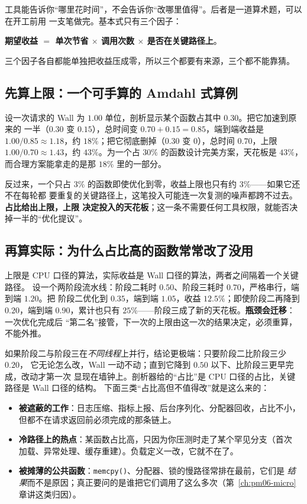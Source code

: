 \documentclass[12pt,a4paper,fontset=fandol]{ctexbook}
\newcommand{\Fn}[1]{\texttt{#1()}}
\newcommand{\Lang}[1]{\textsf{#1}}
\newcommand{\MWall}{\Lang{Wall}}
\newcommand{\MCpu}{\Lang{CPU}}
\begin{document}
工具能告诉你``哪里花时间''，不会告诉你``改哪里值得''。后者是一道算术题，可以在开工前用
一支笔做完。基本式只有三个因子：

\textbf{期望收益 $=$ 单次节省 $\times$ 调用次数 $\times$ 是否在关键路径上}。

三个因子各自都能单独把收益压成零，所以三个都要有来源，三个都不能靠猜。

\subsection{先算上限：一个可手算的 Amdahl 式算例}
\label{sub:pm01-amdahl}

设一次请求的 \MWall{} 为 $1.00$ 单位，剖析显示某个函数占其中 $0.30$。把它加速到原来的
一半（$0.30$ 变 $0.15$），总时间变 $0.70 + 0.15 = 0.85$，端到端收益是
$1.00/0.85 \approx 1.18$，约 $18\%$；把它彻底删掉（$0.30$ 变 $0$），总时间 $0.70$，上限
$1.00/0.70 \approx 1.43$，约 $43\%$。为一个占 $30\%$ 的函数设计完美方案，天花板是
$43\%$，而合理方案能拿走的是那 $18\%$ 里的一部分。

反过来，一个只占 $3\%$ 的函数即使优化到零，收益上限也只有约 $3\%$——如果它还不在每轮都
要重复的关键路径上，这笔投入可能连一次复测的噪声都跨不过去。\textbf{占比给出上限，上限
决定投入的天花板}；这一条不需要任何工具权限，就能否决掉一半的``优化提议''。

\subsection{再算实际：为什么占比高的函数常常改了没用}
\label{sub:pm01-critpath}

上限是 \MCpu{} 口径的算法，实际收益是 \MWall{} 口径的算法，两者之间隔着一个关键路径。
设一个两阶段流水线：阶段二耗时 $0.50$、阶段三耗时 $0.70$，严格串行，端到端 $1.20$。把
阶段二优化到 $0.35$，端到端 $1.05$，收益 $12.5\%$；即使阶段二再降到 $0.20$，端到端
$0.90$，累计也只有 $25\%$——阶段三成了新的天花板。\textbf{瓶颈会迁移}：一次优化完成后
``第二名''接管，下一次的上限由这一次的结果决定，必须重算，不能外推。

如果阶段二与阶段三在\emph{不同线程}上并行，结论更极端：只要阶段二比阶段三少 $0.20$，
它无论怎么改，\MWall{} 一动不动；直到它降到 $0.50$ 以下、比阶段三更早完成，改动才第一次
显现在墙钟上。剖析器给的``占比''是 \MCpu{} 口径的占比，关键路径是 \MWall{} 口径的结构。
下面三类``占比高但不值得改''就是这么来的：

\begin{itemize}
  \item \textbf{被遮蔽的工作}：日志压缩、指标上报、后台序列化、分配器回收，占比不小，
    但都不在请求返回前必须完成的那条链上。
  \item \textbf{冷路径上的热点}：某函数占比高，只因为你压测时走了某个罕见分支（首次
    加载、异常处理、缓存重建）。负载定义一改，它就不在了。
  \item \textbf{被摊薄的公共函数}：\Fn{memcpy}、分配器、锁的慢路径常排在最前，它们是
    \emph{结果}而不是原因；真正要问的是谁把它们调用了这么多次（第~\ref{ch:pm06-micro} 章讲这类归因）。
\end{itemize}
\end{document}
